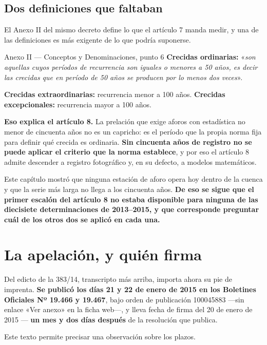 \subsection*{Dos definiciones que faltaban}

El Anexo II del mismo decreto define lo que el artículo 7 manda medir, y una de las
definiciones es más exigente de lo que podría suponerse.

\begin{ficha}{Anexo II --- Conceptos y Denominaciones, punto 6}
\textbf{Crecidas ordinarias:} «\textit{son aquellas cuyos períodos de recurrencia son iguales o
menores a 50 años, es decir las crecidas que en período de 50 años se producen por lo menos dos
veces}».

\textbf{Crecidas extraordinarias:} recurrencia menor a 100 años.
\textbf{Crecidas excepcionales:} recurrencia mayor a 100 años.
\end{ficha}

\textbf{Eso explica el artículo 8.} La prelación que exige aforos con estadística no menor de
cincuenta años no es un capricho: es el período que la propia norma fija para definir qué
crecida es ordinaria. \textbf{Sin cincuenta años de registro no se puede aplicar el criterio
que la norma establece}, y por eso el artículo 8 admite descender a registro fotográfico y,
en su defecto, a modelos matemáticos.

Este capítulo mostró que ninguna estación de aforo opera hoy dentro de la cuenca y que la serie más larga no llega a los cincuenta años. \textbf{De eso se sigue que el primer escalón del artículo 8 no estaba disponible para ninguna de las diecisiete determinaciones de 2013--2015, y que corresponde preguntar cuál de los otros dos se aplicó en cada una.}

\section{La apelación, y quién firma}

Del edicto de la 383/14, transcripto más arriba, importa ahora su pie de imprenta. \textbf{Se publicó los días 21 y 22 de enero de 2015 en los Boletines Oficiales Nº 19.466 y 19.467}, bajo orden de publicación 100045883 ---sin enlace «Ver anexo» en la ficha web---, y lleva fecha de firma del
20 de enero de 2015 --- \textbf{un mes y dos días después} de la resolución que publica.

Este texto permite precisar una observación sobre los plazos.

